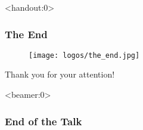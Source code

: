 \documentclass[english,xcolor=pdftex,dvipsnames,aspectratio=<+++ if course.aspectratio is defined +++><++course.aspectratio++><+++else+++>43<+++endif+++>]{beamer}
\begin{document}







      












\begin{frame}<handout:0> 
	\frametitle{The End}
	\begin{center}
		\begin{figure}
			\centering
			
			\texttt{[image: logos/the\_end.jpg]}
		\end{figure}
		Thank you for your attention!
	\end{center}
\end{frame}

\begin{frame}<beamer:0> 
	\frametitle{End of the Talk}

\end{frame}
\end{document}
